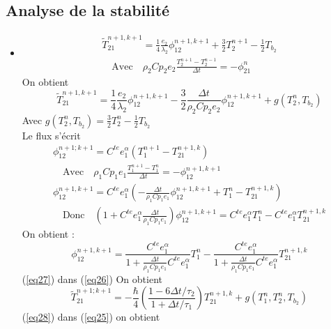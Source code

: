 \documentclass[11pt,a4paper]{scrartcl}%
\newcommand{\mtext}[1]{\quad\text{#1}\quad}%
\begin{document}
	\subsection{Analyse de la stabilité}
	\begin{itemize}
		\item 
		\begin{gather*}
		\tilde{T}_{21}^{n+1, k+1} = \frac{1}{4}\frac{e_2}{\lambda_2}\phi_{12}^{n+1,k+1} + \frac{3}{2}T_2^{n+1} - \frac{1}{2}T_{b_2}\\
		\mtext{Avec} \rho_2C{p_2}e_2 \frac{T_2^{n+1} - T_2^{n-1}}{\Delta t} = -\phi_{21}^n
		\end{gather*}
		On obtient
		\begin{equation}\label{eq26}
		\tilde{T}_{21}^{n+1, k+1} = \frac{1}{4}\frac{e_2}{\lambda_2}\phi_{12}^{n+1,k+1} - \frac{3}{2}\frac{\Delta t}{\rho_2C{p_2}e_2}\phi_{12}^{n+1, k+1} + g(T_2^n, T_{b_2})
		\end{equation}
		Avec $g(T_2^n, T_{b_2}) = \frac{3}{2}T_2^{n} - \frac{1}{2}T_{b_2}$\\
		Le flux s'écrit
		\begin{gather*}
		\phi_{12}^{n+1; k+1} = C^{te}e_1^{\alpha}\left(T_1^{n+1} - T_{21}^{n+1,k} \right)\\
		\mtext{Avec} \rho_1C{p_1}e_1 \frac{T_1^{n+1} - T_1^{n}}{\Delta t} = -\phi_{12}^{n+1, k+1}\\
		\phi_{12}^{n+1, k+1} = C^{te}e_1^{\alpha}\left(-\frac{\Delta t}{\rho_1C{p_1}e_1}\phi_{12}^{n+1, k+1} + T_1^n -T_{21}^{n+1,k}\right)\\
		\mtext{Donc}
		\left(1+C^{te}e_1^{\alpha}\frac{\Delta t}{\rho_1C{p_1}e_1}\right)\phi_{12}^{n+1, k+1} = C^{te}e_1^{\alpha}T_1^n - C^{te}e_1^{\alpha}T_{21}^{n+1,k}
		\end{gather*}
		On obtient :
		\begin{equation}\label{eq27}
		\phi_{12}^{n+1, k+1} = \frac{C^{te}e_1^{\alpha}}{1+\frac{\Delta t}{\rho_1C{p_1}e_1}C^{te}e_1^{\alpha}}T_1^n - \frac{C^{te}e_1^{\alpha}}{1+\frac{\Delta t}{\rho_1C{p_1}e_1}C^{te}e_1^{\alpha}}T_{21}^{n+1,k}
		\end{equation}
		(\ref{eq27}) dans (\ref{eq26}) On obtient
		\begin{equation}\label{eq28}
		\tilde{T}_{21}^{n+1; k+1} = -\frac{\hbar}{4}\left(\frac{1-6\Delta t/\tau_2}{1+\Delta t/\tau_1}\right)T_{21}^{n+1,k} + g(T_1^n, T_2^n, T_{b_2}) 
		\end{equation}
		(\ref{eq28}) dans (\ref{eq25}) on obtient
		\begin{equation}\label{19}

\end{equation}
\end{itemize}
\end{document}
